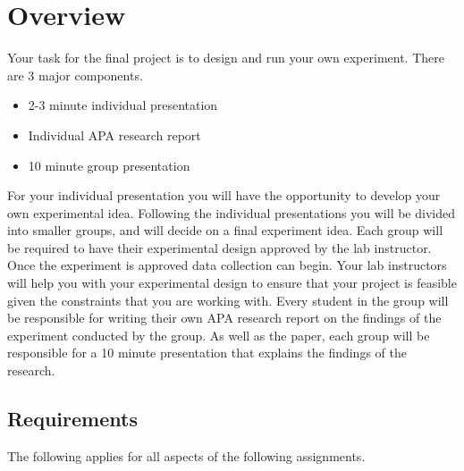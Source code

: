 
\section{Overview}

Your task for the final project is to design and run your own experiment. There are 3 major components.

\begin{itemize}
\item 2-3 minute individual presentation
\item Individual APA research report
\item 10 minute group presentation
\end{itemize}

For your individual presentation you will have the opportunity to develop your own experimental idea. Following the individual presentations you will be divided into smaller groups, and will decide on a final experiment idea. Each group will be required to have their experimental design approved by the lab instructor. Once the experiment is approved data collection can begin. Your lab instructors will help you with your experimental design to ensure that your project is feasible given the constraints that you are working with. Every student in the group will be responsible for writing their own APA research report on the findings of the experiment conducted by the group. As well as the paper, each group will be responsible for a 10 minute presentation that explains the findings of the research.

\subsection{Requirements}

The following applies for all aspects of the following assignments.


